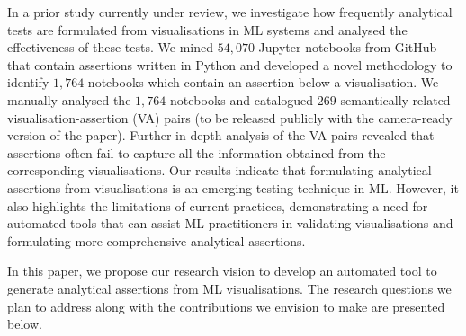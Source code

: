 \documentclass[sigconf]{acmart}
\begin{document}
In a prior study currently under review, we investigate how
frequently analytical tests are formulated from visualisations in ML
systems and analysed the effectiveness of these tests. We mined
$54,070$ Jupyter notebooks from GitHub that contain assertions written
in Python and developed a novel methodology to identify $1,764$
notebooks which contain an assertion below a visualisation. We
manually analysed the $1,764$ notebooks and catalogued $269$
semantically related visualisation-assertion (VA) pairs (to be
released publicly with the camera-ready version of the paper). Further
in-depth analysis of the VA pairs revealed that assertions often fail
to capture all the information obtained from the corresponding
visualisations. Our results indicate that formulating analytical
assertions from visualisations is an emerging testing technique in ML.
However, it also highlights the limitations of current practices,
demonstrating a need for automated tools that can assist ML
practitioners in validating visualisations and formulating more
comprehensive analytical assertions.

In this paper, we propose our research vision to develop an automated
tool to generate analytical assertions from ML visualisations. The
research questions we plan to address along with the contributions we
envision to make are presented below.
\end{document}

